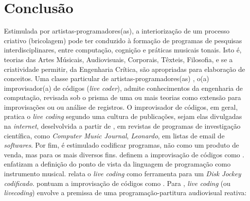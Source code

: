 \chapter*[Conclusão]{Conclusão}\label{conclusao}

Estimulada por artistas-programadores(as), a interiorização de um processo criativo (bricolagem) pode ter conduzido à formação de programas de pesquisas interdisciplinares, entre computação, cognição e práticas musicais tonais. Isto é, teorias das Artes Músicais, Audiovisuais, Corporais, Têxteis, Filosofia, e se a criatividade permitir, da Engenharia Crítica, são apropriadas para elaboração de conceitos. Uma classe particular de artistas-programadores(as) \cite[p.~16]{McLean2011}, o(a) improvisador(a) de códigos (\emph{live coder}), admite conhecimentos da engenharia de computação, revisada sob o prisma de uma ou mais teorias como extensão para improvisações ou ou análise de registros. O improvisador de códigos, em geral, pratica o \emph{live coding} segundo uma cultura de publicações, sejam elas divulgadas na \emph{internet}, deselvolvida a partir de \cite{ward_live_2004}, em revistas de programas de investigação científica, como  \emph{Computer Music Journal}, \emph{Leonardo}, em listas de email de \emph{softwares}. Por fim, é estimulado codificar programas, não como um produto de venda, mas para os mais diversos fins.  definem a improvisação de códigos como .  enfatizam a definição do ponto de vista da linguagem de programação como instrumento musical.  relata o \emph{live coding} como ferramenta para um \emph{Disk Jockey codificado}.   pontuam a improvisação de códigos como . Para , \emph{live coding} (ou \emph{livecoding}) envolve a premissa de uma programação-partitura audiovisual reativa: 


